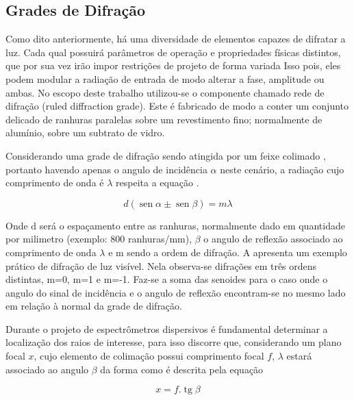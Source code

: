 \documentclass[oneside,openright,12pt]{ufsm_2021} %
\renewcommand{\sin}{\operatorname{sen}}
\renewcommand{\tan}{\operatorname{tg}}
\begin{document}
        \subsection{Grades de Difração}
        \par Como dito anteriormente, há uma diversidade de elementos capazes de difratar a luz. Cada qual possuirá parâmetros de operação e propriedades físicas distintos, que por sua vez irão impor restrições de projeto de forma variada Isso pois, eles podem modular a radiação de entrada \cite{Hasset} de modo alterar a fase, amplitude ou ambas. No escopo deste trabalho utilizou-se o componente chamado rede de difração (ruled diffraction grade). Este é fabricado de modo a conter um conjunto delicado de ranhuras paralelas sobre um revestimento fino; normalmente de alumínio, sobre um subtrato de vidro.

        \par Considerando uma grade de difração sendo atingida por um feixe colimado \cite{Debung}, portanto havendo apenas o angulo de incidência $\alpha$ neste cenário, a radiação cujo comprimento de onda é $\lambda$ respeita a equação \cite{numero}. 

            \begin{equation}
                \label{eq:DifragaoGeral}
                d(\sin \alpha \pm \sin \beta) = m\lambda
            \end{equation}
            
        \par Onde d será o espaçamento entre as ranhuras, normalmente dado em quantidade por milimetro (exemplo: 800 ranhuras/mm), $\beta$ o angulo de reflexão associado ao comprimento de onda $\lambda$ e m sendo a ordem de difração. A \cite{Figura2} apresenta um exemplo prático de difração de luz visível. Nela observa-se difrações em três ordens distintas, m=0, m=1 e m=-1. Faz-se a soma das senoides \cite{Debuc} para o caso onde o angulo do sinal de incidência e o angulo de reflexão encontram-se no mesmo lado em relação à normal da grade de difração.

        \par Durante o projeto de espectrômetros dispersivos é fundamental determinar a localização dos raios de interesse, para isso \cite{artigo1} discorre que, considerando um plano focal $x$, cujo elemento de colimação possui comprimento focal $f$, $\lambda$ estará associado ao angulo $\beta$ da forma como é descrita pela equação \cite{equaao4}

            \begin{equation}
                \label{eq:DirDifracao}
                x = f.\tan\beta
            \end{equation}
\end{document}
